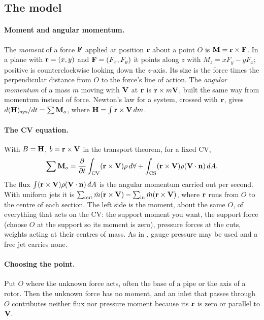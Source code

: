 \subsection*{The model}

\paragraph{Moment and angular momentum.} The \emph{moment} of a force $\mathbf{F}$ applied at position $\mathbf{r}$ about a point $O$ is $\mathbf{M} = \mathbf{r}\times\mathbf{F}$. In a plane with $\mathbf{r} = (x, y)$ and $\mathbf{F} = (F_x, F_y)$ it points along $z$ with $M_z = xF_y - yF_x$; positive is counterclockwise looking down the $z$-axis. Its size is the force times the perpendicular distance from $O$ to the force's line of action. The \emph{angular momentum} of a mass $m$ moving with $\mathbf{V}$ at $\mathbf{r}$ is $\mathbf{r}\times m\mathbf{V}$, built the same way from momentum instead of force. Newton's law for a system, crossed with $\mathbf{r}$, gives $d(\mathbf{H})_\text{sys}/dt = \sum\mathbf{M}_o$, where $\mathbf{H} = \int\mathbf{r}\times\mathbf{V}\,dm$.

\paragraph{The CV equation.} With $B = \mathbf{H}$, $b = \mathbf{r}\times\mathbf{V}$ in the transport theorem, for a fixed CV,
\[
\sum\mathbf{M}_o = \frac{\partial }{\partial t}\int_\text{CV}(\mathbf{r}\times\mathbf{V})\rho\,d\forall + \int_\text{CS}(\mathbf{r}\times\mathbf{V})\rho(\mathbf{V}\cdot\mathbf{n})\,dA .
\]
The flux $\int(\mathbf{r}\times\mathbf{V})\rho(\mathbf{V}\cdot\mathbf{n})\,dA$ is the angular momentum carried out per second. With uniform jets it is $\sum_\text{out}\dot m(\mathbf{r}\times\mathbf{V}) - \sum_\text{in}\dot m(\mathbf{r}\times\mathbf{V})$, where $\mathbf{r}$ runs from $O$ to the centre of each section. The left side is the moment, about the same $O$, of everything that acts on the CV: the support moment you want, the support force (choose $O$ at the support so its moment is zero), pressure forces at the cuts, weights acting at their centres of mass. As in , gauge pressure may be used and a free jet carries none.

\paragraph{Choosing the point.} Put $O$ where the unknown force acts, often the base of a pipe or the axis of a rotor. Then the unknown force has no moment, and an inlet that passes through $O$ contributes neither flux nor pressure moment because its $\mathbf{r}$ is zero or parallel to $\mathbf{V}$.

